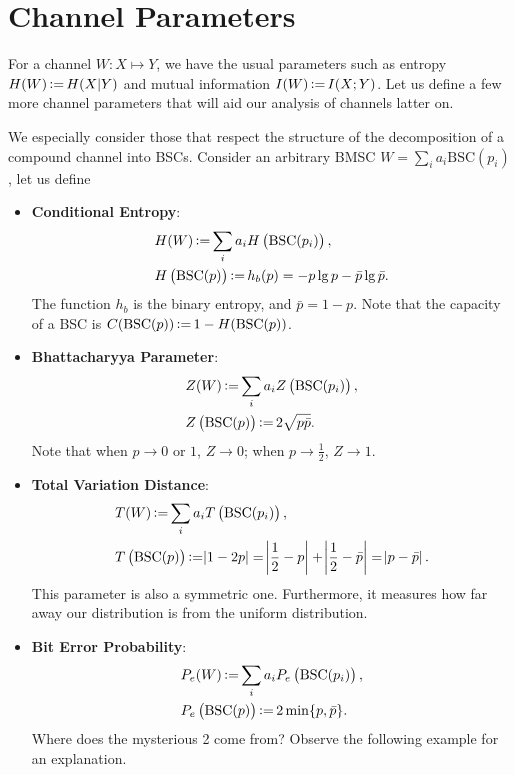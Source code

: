 \section{Channel Parameters}

For a channel $W:X\mapsto Y$, we have the usual parameters such as entropy $H(W)\operatorname{\vcentcolon=} H(X\vert Y)$ and mutual information $I(W)\operatorname{\vcentcolon=} I(X;Y)$. Let us define a few more channel parameters that will aid our analysis of channels latter on.

We especially consider those that respect the structure of the decomposition of a compound channel into BSCs. Consider an arbitrary BMSC $W=\sum_{i}a_i\mathrm{BSC}(p_i)$, let us define
\begin{definition}
    \begin{itemize}
        \item \textbf{Conditional Entropy}:
        \begin{align}
            &H(W) \operatorname{\vcentcolon=} \sum_{i}a_i H\left(\mathrm{BSC}(p_i)\right),\\
            &H\left(\mathrm{BSC}(p)\right) \operatorname{\vcentcolon=} h_b(p) = -p\lg p - \bar{p}\lg\bar{p}.
        \end{align}
        The function $h_b$ is the binary entropy, and $\bar{p}=1-p$. Note that the capacity of a BSC is $C(\mathrm{BSC}(p)) \operatorname{\vcentcolon=} 1-H(\mathrm{BSC}(p))$.
        \item \textbf{Bhattacharyya Parameter}:
        \begin{align}
            &Z(W) \operatorname{\vcentcolon=} \sum_{i}a_i Z\left(\mathrm{BSC}(p_i)\right),\\
            &Z\left(\mathrm{BSC}(p)\right) \operatorname{\vcentcolon=} 2\sqrt{p\bar{p}}.
        \end{align}
        Note that when $p\rightarrow0$ or $1$, $Z\rightarrow0$; when $p\rightarrow\frac{1}{2}$, $Z\rightarrow1$.
        \item \textbf{Total Variation Distance}:
        \begin{align}
            &T(W) \operatorname{\vcentcolon=} \sum_{i}a_i T\left(\mathrm{BSC}(p_i)\right),\\
            &T\left(\mathrm{BSC}(p)\right) \operatorname{\vcentcolon=} \abs{1-2p} = \abs{\frac{1}{2}-p} + \abs{\frac{1}{2}-\bar{p}} = \abs{p-\bar{p}}.
        \end{align}
        This parameter is also a symmetric one. Furthermore, it measures how far away our distribution is from the uniform distribution.
        \item \textbf{Bit Error Probability}:
        \begin{align}
            &P_e(W) \operatorname{\vcentcolon=} \sum_{i}a_i P_e\left(\mathrm{BSC}(p_i)\right),\\
            &P_e\left(\mathrm{BSC}(p)\right) \operatorname{\vcentcolon=} 2\min\{p,\bar{p}\}.
        \end{align}
        Where does the mysterious 2 come from? Observe the following example for an explanation.
    \end{itemize}
\end{definition}

